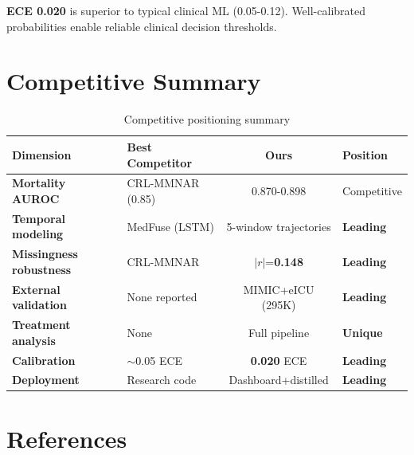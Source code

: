 \documentclass[11pt,a4paper]{article}
\renewcommand{\arraystretch}{1.25}
\begin{document}
\begin{leadingbox}
\textbf{ECE 0.020} is superior to typical clinical ML (0.05-0.12). Well-calibrated probabilities enable reliable clinical decision thresholds.
\end{leadingbox}

\section{Competitive Summary}

\begin{table}[H]
\centering
\small
\renewcommand{\arraystretch}{1.35}
\begin{tabular}{>{\bfseries}p{2.8cm}p{2.5cm}cp{2.8cm}}
\toprule
\rowcolor{tableheader}
\textbf{Dimension} & \textbf{Best Competitor} & \textbf{Ours} & \textbf{Position} \\
\midrule
Mortality AUROC & CRL-MMNAR (0.85) & 0.870-0.898 & \cellcolor{competitive}Competitive \\
Temporal modeling & MedFuse (LSTM) & 5-window trajectories & \cellcolor{leading}\textbf{Leading} \\
Missingness robustness & CRL-MMNAR & $|r|$=\textbf{0.148} & \cellcolor{leading}\textbf{Leading} \\
External validation & None reported & MIMIC+eICU (295K) & \cellcolor{leading}\textbf{Leading} \\
Treatment analysis & None & Full pipeline & \cellcolor{unique}\textbf{Unique} \\
Calibration & $\sim$0.05 ECE & \textbf{0.020} ECE & \cellcolor{leading}\textbf{Leading} \\
Deployment & Research code & Dashboard+distilled & \cellcolor{leading}\textbf{Leading} \\
\bottomrule
\end{tabular}
\caption{Competitive positioning summary}
\end{table}

\section{References}
\end{document}

